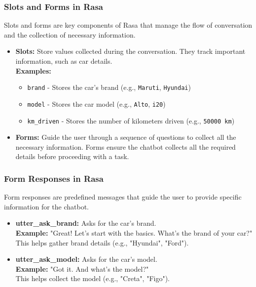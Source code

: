 \documentclass{beamer}
\begin{document}
\begin{frame}
	\frametitle{Slots and Forms in Rasa}

	Slots and forms are key components of Rasa that manage the flow of conversation and the collection of necessary information.

	\begin{itemize}
		\item \textbf{Slots:} Store values collected during the conversation. They track important information, such as car details.
		\\ \textbf{Examples:}
		\begin{itemize}
			\item \texttt{brand} - Stores the car's brand (e.g., \texttt{Maruti}, \texttt{Hyundai})
			\item \texttt{model} - Stores the car model (e.g., \texttt{Alto}, \texttt{i20})
			\item \texttt{km\_driven} - Stores the number of kilometers driven (e.g., \texttt{50000 km})
		\end{itemize}

		\item \textbf{Forms:} Guide the user through a sequence of questions to collect all the necessary information.
	Forms ensure the chatbot collects all the required details before proceeding with a task.
	\end{itemize}


\end{frame}

\begin{frame}
	\frametitle{Form Responses in Rasa}

	Form responses are predefined messages that guide the user to provide specific information for the chatbot.

	\begin{itemize}
		\item \textbf{utter\_ask\_brand:} Asks for the car's brand.
		\\ \textbf{Example:} "Great! Let's start with the basics. What’s the brand of your car?"
		\\ This helps gather brand details (e.g., "Hyundai", "Ford").
		
		\item \textbf{utter\_ask\_model:} Asks for the car's model.
		\\ \textbf{Example:} "Got it. And what’s the model?"
		\\ This helps collect the model (e.g., "Creta", "Figo").
	\end{itemize}
\end{frame}
\end{document}
